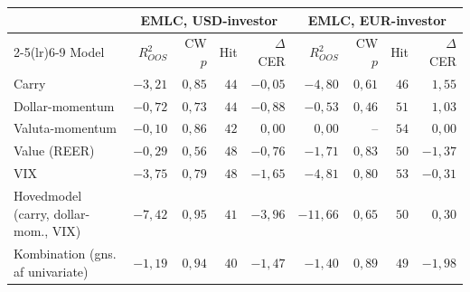 \begin{tabular}{lrrrrrrrr}
\toprule
 & \multicolumn{4}{c}{EMLC, USD-investor} & \multicolumn{4}{c}{EMLC, EUR-investor} \\
\cmidrule(lr){2-5}\cmidrule(lr){6-9}
Model & $R^2_{OOS}$ & CW $p$ & Hit & $\Delta$CER & $R^2_{OOS}$ & CW $p$ & Hit & $\Delta$CER \\
\midrule
Carry & $-3{,}21$ & $0{,}85$ & $44$ & $-0{,}05$ & $-4{,}80$ & $0{,}61$ & $46$ & $1{,}55$ \\
Dollar-momentum & $-0{,}72$ & $0{,}73$ & $44$ & $-0{,}88$ & $-0{,}53$ & $0{,}46$ & $51$ & $1{,}03$ \\
Valuta-momentum & $-0{,}10$ & $0{,}86$ & $42$ & $0{,}00$ & $0{,}00$ & -- & $54$ & $0{,}00$ \\
Value (REER) & $-0{,}29$ & $0{,}56$ & $48$ & $-0{,}76$ & $-1{,}71$ & $0{,}83$ & $50$ & $-1{,}37$ \\
VIX & $-3{,}75$ & $0{,}79$ & $48$ & $-1{,}65$ & $-4{,}81$ & $0{,}80$ & $53$ & $-0{,}31$ \\
\midrule
Hovedmodel (carry, dollar-mom., VIX) & $-7{,}42$ & $0{,}95$ & $41$ & $-3{,}96$ & $-11{,}66$ & $0{,}65$ & $50$ & $0{,}30$ \\
Kombination (gns. af univariate) & $-1{,}19$ & $0{,}94$ & $40$ & $-1{,}47$ & $-1{,}40$ & $0{,}89$ & $49$ & $-1{,}98$ \\
\bottomrule
\end{tabular}
